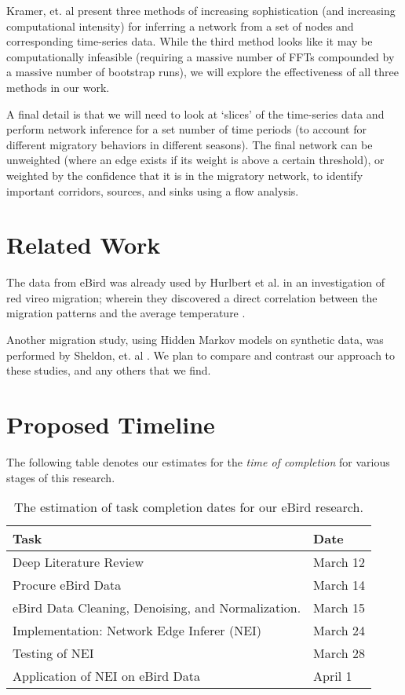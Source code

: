 \documentclass[11pt]{article}
\begin{document}
\begin{multicols}{2}
Kramer, et. al present three methods of increasing sophistication (and increasing computational intensity) for inferring a network from a set of nodes and corresponding time-series data. While the third method looks like it may be computationally infeasible (requiring a massive number of FFTs compounded by a massive number of bootstrap runs), we will explore the effectiveness of all three methods in our work. 

A final detail is that we will need to look at `slices' of the time-series data and perform network inference for a set number of time periods (to account for different migratory behaviors in different seasons). The final network can be unweighted (where an edge exists if its weight is above a certain threshold), or weighted by the confidence that it is in the migratory network, to identify important corridors, sources, and sinks using a flow analysis. 

\section{Related Work}
The data from eBird was already used by Hurlbert et al. in an investigation of red vireo migration; wherein they discovered a direct correlation between the migration patterns and the average temperature \cite{hurlbert}. 

Another migration study, using Hidden Markov models on synthetic data, was performed by Sheldon, et. al \cite{conf/nips/SheldonEK07}. We plan to compare and contrast our approach to these studies, and any others that we find.

\section{Proposed Timeline} \vspace{-10 pt}
The following table denotes our estimates for the \textit{time of completion} for various stages of this research.
\begin{table*}
\centering
\begin{tabular}{|ll|} \hline
Task & Date\\ \hline
Deep Literature Review & March 12  \\
Procure eBird Data & March 14 \\
eBird Data Cleaning, Denoising, and Normalization. & March 15 \\
Implementation: Network Edge Inferer (NEI) &March 24 \\
Testing of NEI & March 28  \\
Application of NEI on eBird Data & April 1 \\

\hline\end{tabular}
\caption{The estimation of task completion dates for our eBird research.}
\label{table:chart}
\end{table*}

\end{multicols}


\end{document}
